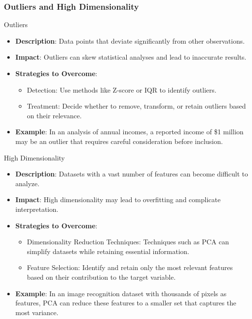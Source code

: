 \documentclass[aspectratio=169]{beamer}
\begin{document}
\begin{frame}[fragile]
    \frametitle{Outliers and High Dimensionality}
    \begin{block}{Outliers}
        \begin{itemize}
            \item \textbf{Description}: Data points that deviate significantly from other observations.
            \item \textbf{Impact}: Outliers can skew statistical analyses and lead to inaccurate results.
            \item \textbf{Strategies to Overcome}:
                \begin{itemize}
                    \item Detection: Use methods like Z-score or IQR to identify outliers.
                    \item Treatment: Decide whether to remove, transform, or retain outliers based on their relevance.
                \end{itemize}
            \item \textbf{Example}: In an analysis of annual incomes, a reported income of \$1 million may be an outlier that requires careful consideration before inclusion.
        \end{itemize}
    \end{block}
    \begin{block}{High Dimensionality}
        \begin{itemize}
            \item \textbf{Description}: Datasets with a vast number of features can become difficult to analyze.
            \item \textbf{Impact}: High dimensionality may lead to overfitting and complicate interpretation.
            \item \textbf{Strategies to Overcome}:
                \begin{itemize}
                    \item Dimensionality Reduction Techniques: Techniques such as PCA can simplify datasets while retaining essential information.
                    \item Feature Selection: Identify and retain only the most relevant features based on their contribution to the target variable.
                \end{itemize}
            \item \textbf{Example}: In an image recognition dataset with thousands of pixels as features, PCA can reduce these features to a smaller set that captures the most variance.
        \end{itemize}
    \end{block}
\end{frame}
\end{document}
